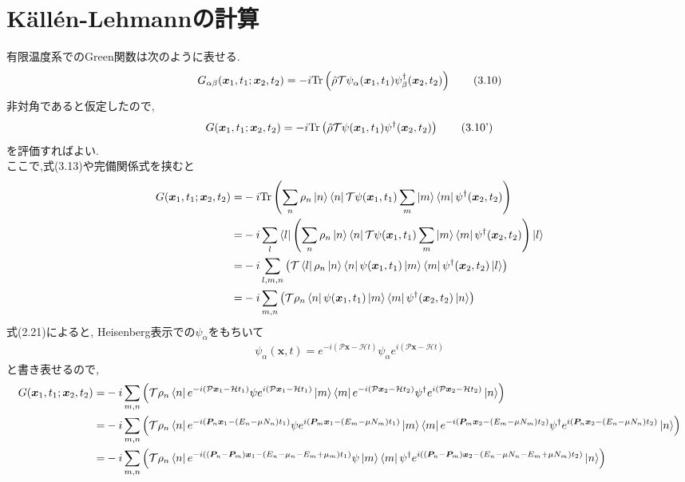 \documentclass[platex, a4j, 9pt, dvipdfmx]{jsarticle}
\begin{document}
\section*{K\"all\'en-Lehmannの計算}

有限温度系でのGreen関数は次のように表せる.
\begin{align}
    G_{\alpha\beta}(\bm{x}_1,t_1;\bm{x}_2,t_2) = -i{\rm Tr}\left(\hat{\rho}\mathcal{T}\psi_{\alpha}(\bm{x}_1,t_1)\psi_{\beta}^{\dagger}(\bm{x}_2,t_2)\right) \tag{3.10}
\end{align}
非対角であると仮定したので,
\begin{align}
    G(\bm{x}_1,t_1;\bm{x}_2,t_2) = -i{\rm Tr}\left(\hat{\rho}\mathcal{T}\psi(\bm{x}_1,t_1)\psi^{\dagger}(\bm{x}_2,t_2)\right) \tag{3.10'}
\end{align}
を評価すればよい.\\
ここで,式(3.13)や完備関係式を挟むと
\begin{align}
    G(\bm{x}_1,t_1;\bm{x}_2,t_2) =& -i{\rm Tr}\left(\sum_{n}\rho_n\ket{n}\bra{n}\mathcal{T}\psi(\bm{x}_1,t_1)\sum_{m}\ket{m}\bra{m}\psi^{\dagger}(\bm{x}_2,t_2)\right) \\
    =& -i\sum_{l}\bra{l}\left(\sum_{n}\rho_n\ket{n}\bra{n}\mathcal{T}\psi(\bm{x}_1,t_1)\sum_{m}\ket{m}\bra{m}\psi^{\dagger}(\bm{x}_2,t_2)\right)\ket{l}\\
    =& -i\sum_{l,m,n}\left(\mathcal{T}\bra{l}\rho_n\ket{n}\bra{n}\psi(\bm{x}_1,t_1)\ket{m}\bra{m}\psi^{\dagger}(\bm{x}_2,t_2)\ket{l}\right)\\
    =& -i\sum_{m,n}\left(\mathcal{T}\rho_n\bra{n}\psi(\bm{x}_1,t_1)\ket{m}\bra{m}\psi^{\dagger}(\bm{x}_2,t_2)\ket{n}\right)
\end{align}
式(2.21)によると, Heisenberg表示での$\psi_{\alpha}$をもちいて
\begin{align}
    \psi_{\alpha}(\bm{x},t) = e^{-i(\mathcal{P}\bm{x}-\mathcal{H}t)}\psi_{\alpha}e^{i(\mathcal{P}\bm{x}-\mathcal{H}t)} \tag{2.21}
\end{align}
と書き表せるので,
\begin{align}
    G(\bm{x}_1,t_1;\bm{x}_2,t_2) =& -i\sum_{m,n}\left(\mathcal{T}\rho_n\bra{n}e^{-i(\mathcal{P}\bm{x}_1-\mathcal{H}t_1)}\psi e^{i(\mathcal{P}\bm{x}_1-\mathcal{H}t_1)}\ket{m}\bra{m}e^{-i(\mathcal{P}\bm{x}_2-\mathcal{H}t_2)}\psi^{\dagger}e^{i(\mathcal{P}\bm{x}_2-\mathcal{H}t_2)}\ket{n}\right)\\
    =& -i\sum_{m,n}\left(\mathcal{T}\rho_n\bra{n}e^{-i(\bm{P}_n\bm{x}_1-(E_n-\mu N_n)t_1)}\psi e^{i(\bm{P}_m\bm{x}_1-(E_m-\mu N_m)t_1)}\ket{m}\bra{m}e^{-i(\bm{P}_m\bm{x}_2-(E_m-\mu N_m)t_2)}\psi^{\dagger}e^{i(\bm{P}_n\bm{x}_2-(E_n-\mu N_n)t_2)}\ket{n}\right)\\
    =& -i\sum_{m,n}\left(\mathcal{T}\rho_n\bra{n}e^{-i((\bm{P}_n-\bm{P}_m)\bm{x}_1-(E_n-\mu_n-E_m+\mu_m)t_1)}\psi\ket{m}\bra{m}\psi^{\dagger}e^{i((\bm{P}_n-\bm{P}_m)\bm{x}_2-(E_n-\mu N_n-E_m+\mu N_m)t_2)}\ket{n}\right)\\
\end{align}
\end{document}
